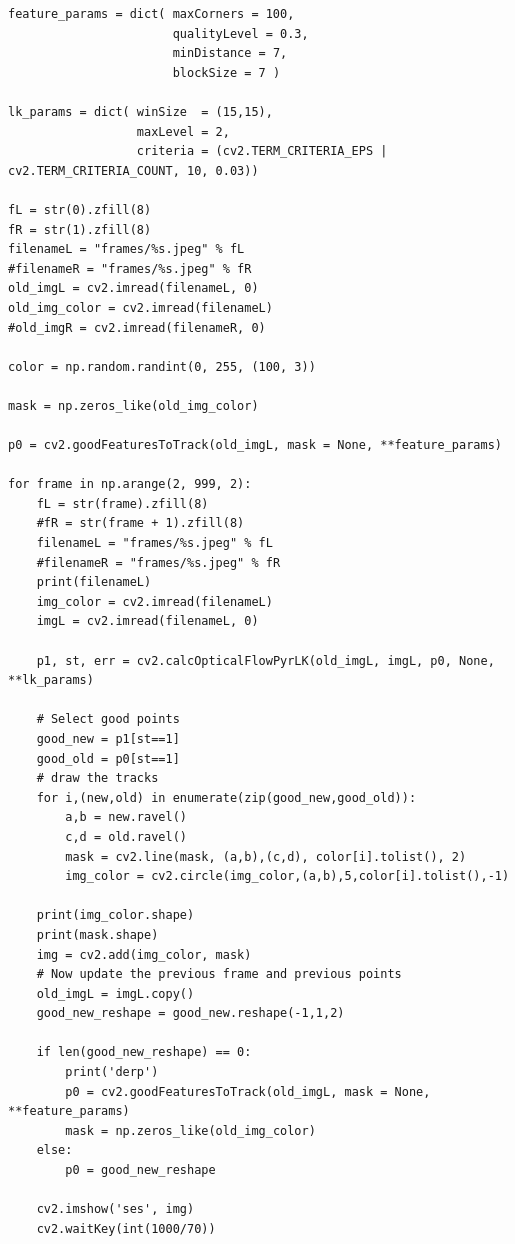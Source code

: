 \documentclass{article}
\begin{document}
\begin{verbatim}
feature_params = dict( maxCorners = 100,
                       qualityLevel = 0.3,
                       minDistance = 7,
                       blockSize = 7 )

lk_params = dict( winSize  = (15,15),
                  maxLevel = 2,
                  criteria = (cv2.TERM_CRITERIA_EPS | cv2.TERM_CRITERIA_COUNT, 10, 0.03))

fL = str(0).zfill(8)
fR = str(1).zfill(8)
filenameL = "frames/%s.jpeg" % fL
#filenameR = "frames/%s.jpeg" % fR
old_imgL = cv2.imread(filenameL, 0)
old_img_color = cv2.imread(filenameL)
#old_imgR = cv2.imread(filenameR, 0)

color = np.random.randint(0, 255, (100, 3))

mask = np.zeros_like(old_img_color)

p0 = cv2.goodFeaturesToTrack(old_imgL, mask = None, **feature_params)

for frame in np.arange(2, 999, 2):
    fL = str(frame).zfill(8)
    #fR = str(frame + 1).zfill(8)
    filenameL = "frames/%s.jpeg" % fL
    #filenameR = "frames/%s.jpeg" % fR
    print(filenameL)
    img_color = cv2.imread(filenameL)
    imgL = cv2.imread(filenameL, 0)

    p1, st, err = cv2.calcOpticalFlowPyrLK(old_imgL, imgL, p0, None, **lk_params)

    # Select good points
    good_new = p1[st==1]
    good_old = p0[st==1]
    # draw the tracks
    for i,(new,old) in enumerate(zip(good_new,good_old)):
        a,b = new.ravel()
        c,d = old.ravel()
        mask = cv2.line(mask, (a,b),(c,d), color[i].tolist(), 2)
        img_color = cv2.circle(img_color,(a,b),5,color[i].tolist(),-1)

    print(img_color.shape)
    print(mask.shape)
    img = cv2.add(img_color, mask)
    # Now update the previous frame and previous points
    old_imgL = imgL.copy()
    good_new_reshape = good_new.reshape(-1,1,2)

    if len(good_new_reshape) == 0:
        print('derp')
        p0 = cv2.goodFeaturesToTrack(old_imgL, mask = None, **feature_params)
        mask = np.zeros_like(old_img_color)
    else:
        p0 = good_new_reshape
        
    cv2.imshow('ses', img)
    cv2.waitKey(int(1000/70))
\end{verbatim}
\end{document}
